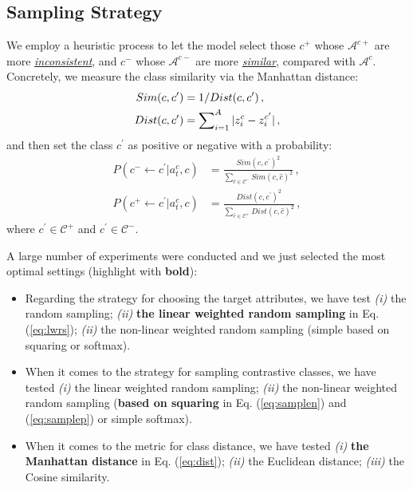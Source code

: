 \documentclass[letterpaper]{article} \usepackage{aaai23}  \usepackage{times}  \usepackage{helvet}  \usepackage{courier}  \usepackage[hyphens]{url}  \usepackage{graphicx} \urlstyle{rm} \def\UrlFont{\rm}  \usepackage{natbib}  \usepackage{caption} \frenchspacing  \setlength{\pdfpagewidth}{8.5in}  \setlength{\pdfpageheight}{11in}  \usepackage{algorithm}
\newcommand{\wen}[1]{{\color{black}#1}}
\begin{document}
\subsection{Sampling Strategy}
We employ a heuristic process to let the model 
select those $c^+$ whose $\mathcal{A}^{c+}$ are more \ul{\emph{inconsistent}}, and  $c^-$ whose $\mathcal{A}^{c-}$ are more \ul{\emph{similar}}, compared with $\mathcal{A}^c$. 
Concretely, we measure the class similarity via 
the Manhattan distance:
\begin{align}
	Sim(c,c\wen{^\prime}) &= 1 / Dist(c,c\wen{^\prime})\,, \\ 
\label{eq:dist}
	Dist(c,c\wen{^\prime}) &=  \sum\nolimits_{i=1}^{A} |z^c_i - z^{c\wen{^\prime}}_i |\,,
\end{align}
and then {set the}
class $c^\prime$  as positive or negative with {a} 
probability:
\begin{align} 
\label{eq:samplen}
    P(c^- \gets c^\prime |a^c_{t}, c) &= \frac{Sim(c,c^\prime)^2}{\sum_{\hat{c} \in \mathcal{C}^-} Sim(c,\hat{c})^2 }\,,\\
\label{eq:samplep}
    P(c^+ \gets c^\prime |a^c_{t}, c) &= \frac{Dist(c,c^\prime)^2}{\sum_{\hat{c} \in \mathcal{\mathcal{C}}^+} Dist(c,\hat{c})^2 }\,,
\end{align}
where $c^\prime \in \mathcal{C}^+$ {and} $c^\prime \in \mathcal{C}^-$.

A large number of experiments were conducted and we just selected the most optimal settings (highlight with \textbf{bold}):
\begin{itemize}
\item Regarding the strategy for choosing the target attributes, we have test \textit{(i)} the random sampling; \textit{(ii)} \textbf{the linear weighted random sampling} in Eq. (\ref{eq:lwrs}); \textit{(ii)} the non-linear weighted random sampling (simple based on squaring or softmax).
\item When it comes to the strategy for sampling contrastive classes, we have tested \textit{(i)} the linear weighted random sampling;  \textit{(ii)} the non-linear weighted random sampling (\textbf{based on squaring} in Eq. (\ref{eq:samplen}) and (\ref{eq:samplep}) or simple softmax).
\item When it comes to the metric for class distance, we have tested \textit{(i)} \textbf{the Manhattan distance} in Eq. (\ref{eq:dist}); \textit{(ii)} the Euclidean distance; \textit{(iii)} the Cosine similarity.
\end{itemize}
\end{document}
